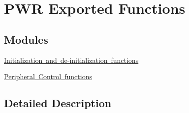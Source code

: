 \hypertarget{group___p_w_r___exported___functions}{}\section{P\+WR Exported Functions}
\label{group___p_w_r___exported___functions}
\subsection*{Modules}
\begin{DoxyCompactItemize}
\item 
\mbox{\hyperlink{group___p_w_r___exported___functions___group1}{Initialization and de-\/initialization functions}}
\item 
\mbox{\hyperlink{group___p_w_r___exported___functions___group2}{Peripheral Control functions}}
\end{DoxyCompactItemize}


\subsection{Detailed Description}
